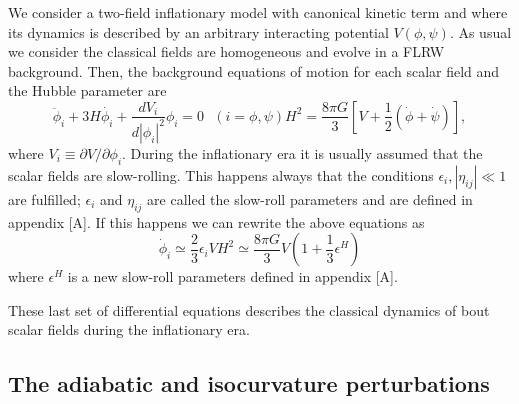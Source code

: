 \documentclass[amssymb,twocolumn,prd,nofootinbib,showpacs]{revtex4-1}
\begin{document}
We consider a two-field inflationary model with canonical kinetic term and where its dynamics is described by an arbitrary interacting potential $V(\phi,\psi)$. As usual we consider the classical fields are homogeneous and evolve in a FLRW background. Then, the background equations of motion for each scalar field and the Hubble parameter are
\begin{subequations}
\begin{equation}\label{KGEq}
\ddot{\phi}_i+3H\dot{\phi_i}+\frac{dV_i}{d|\phi_i|^2}\phi_i=0 \ \ \ (i=\phi,\psi)
\end{equation}
\begin{equation}
H^2=\frac{8\pi G}{3}\left[V+\frac{1}{2}\left(\dot{\phi}+\dot\psi\right)\right],
\end{equation}
\end{subequations}
where $V_i\equiv\partial V/\partial \phi_i$. During the inflationary era it is usually assumed that the scalar fields are slow-rolling. This happens always that the conditions $\epsilon_i,|\eta_{ij}|\ll 1$ are fulfilled; $\epsilon_i$ and $\eta_{ij}$ are called the slow-roll parameters and are defined in appendix [A]. If this happens we can rewrite the above equations as
\begin{subequations}
\begin{equation}
\dot{\phi}_i\simeq \frac{2}{3}\epsilon_i V
\end{equation}
\begin{equation}
H^2\simeq \frac{8\pi G}{3}V\left(1+\frac{1}{3}\epsilon^H\right)
\end{equation}
\end{subequations}
where $\epsilon^H$ is a new slow-roll parameters defined in appendix [A]. 

These last set of differential equations describes the classical dynamics of bout scalar fields during the inflationary era.
\subsection{The adiabatic and isocurvature perturbations}
\end{document}
